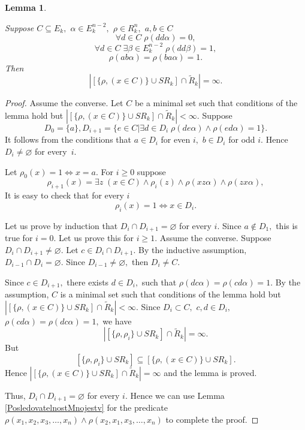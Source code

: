 \documentclass{au}
\theoremstyle{plain}
\newtheorem{lemma}{Lemma}
\theoremstyle{definition}
\theoremstyle{remark}
\numberwithin{equation}{section}
\begin{document}
\begin{lemma}\label{EstSymmetrichnoeRebro}

Suppose
$C\subseteq E_{k},$
$\alpha \in E_{k}^{n-2},$
$\rho \in R_{k}^{n},$
$a,b\in C$
$$\forall d \in C \; \rho(d d \alpha) =  0,$$
$$\forall d \in C\; \exists \beta \in E_{k}^{n-2} \; \rho(d d \beta) =  1,$$
$$\rho(a b \alpha) = \rho(b a \alpha) = 1.$$
Then $$|[\{\rho,(x\in C)\} \cup SR_{k} ]\cap \widetilde R_{k}| = \infty.$$
\end{lemma}

\begin{proof}

Assume the converse.
Let $C$ be a minimal set such that
conditions of the lemma hold but
$|[\{\rho,(x\in C)\} \cup SR_{k} ]\cap \widetilde R_{k}|<\infty.$
Suppose
$$D_{0} = \{a\},
D_{i+1} = \{e\in C | \exists d \in D_{i}\; \rho(d e \alpha) \wedge \rho(e d \alpha) =1 \}.$$
It follows from the conditions that
$a\in D_{i}$ for even $i,$
$b\in D_{i}$ for odd $i.$
Hence $D_{i} \neq \varnothing $ for every~$i.$

Let $\rho_{0}(x) = 1 \Longleftrightarrow x = a.$ For $i\ge 0$ suppose
$$\rho_{i+1}(x) = \exists z \; (x\in C)\wedge \rho_{i}(z)\wedge \rho ( x z \alpha) \wedge \rho ( z x \alpha),$$
It is easy to check that  for every $i$
$$\rho_{i}(x) = 1 \Longleftrightarrow x \in D_{i}.$$

Let us prove by induction that $D_{i}\cap D_{i+1} = \varnothing$ for every $i.$
Since $a \notin D_{1},$ this is true for $i=0.$
Let us prove this for $i\ge 1.$
Assume the converse.
Suppose
$D_{i}\cap D_{i+1}\neq \varnothing.$
Let $c\in D_{i}\cap D_{i+1}.$
By the inductive assumption,
$D_{i-1}\cap D_{i}=\varnothing.$
Since $D_{i-1}\neq \varnothing,$ then $D_{i} \neq C.$

Since $c\in D_{i+1},$ there exists $d\in D_{i},$
such that $\rho(d c \alpha) = \rho(c d\alpha) = 1.$
By the assumption,
$C$ is a minimal set such that
conditions of the lemma hold but
$|[\{\rho,(x\in C)\} \cup SR_{k} ]\cap \widetilde R_{k}|<\infty.$
Since $D_{i}\subset C,$ $c,d\in D_{i},$ $\rho(c d \alpha) = \rho(d c \alpha)=1,$
we have $$|[\{\rho,\rho_{i}\} \cup SR_{k} ] \cap \widetilde R_{k}| = \infty.$$
But $$[\{\rho,\rho_{i}\} \cup SR_{k} ] \subseteq [\{\rho,(x\in C)\} \cup SR_{k} ].$$
Hence $|[\{\rho,(x\in C)\} \cup SR_{k} ] \cap \widetilde R_{k}| = \infty$ and the lemma is proved.

Thus, $D_{i}\cap D_{i+1} = \varnothing$ for every $i.$
Hence we can use Lemma \ref{PosledovatelnostMnojestv} for the predicate
$\rho(x_{1},x_{2},x_{3},\ldots,x_{n})\wedge \rho(x_{2},x_{1},x_{3},\ldots,x_{n})$
to complete the proof.

\end{proof}
\end{document}
